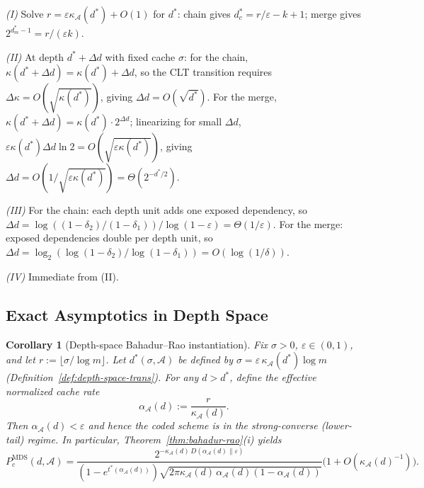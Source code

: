 \documentclass[journal]{IEEEtran}
\makeatletter
\newtheorem{corollary}{Corollary}[section]
\numberwithin{equation}{section}
\renewenvironment{proof}[1][\proofname]{\par
  \pushQED{\qed}%
  \normalfont \topsep6\p@\@plus6\p@\relax
  \trivlist
  \item[\hskip\labelsep
        \itshape
    #1\@addpunct{.}]\ignorespaces
}{%
  \popQED\endtrivlist\@endpefalse
}
\makeatother
\begin{document}
\begin{proof}
\emph{(I)}\;
Solve $r=\varepsilon\kappa_{\mathcal A}(d^*)+O(1)$
for $d^*$: chain gives $d^*_c=r/\varepsilon-k+1$;
merge gives $2^{d^*_m-1}=r/(\varepsilon k)$.

\emph{(II)}\;
At depth $d^*{+}\Delta d$ with fixed cache $\sigma$:
for the chain,
$\kappa(d^*{+}\Delta d)=\kappa(d^*)+\Delta d$, so the
CLT transition requires
$\Delta\kappa=O(\sqrt{\kappa(d^*)})$, giving
$\Delta d=O(\sqrt{d^*})$.
For the merge,
$\kappa(d^*{+}\Delta d)=\kappa(d^*)\cdot 2^{\Delta d}$;
linearizing for small $\Delta d$,
$\varepsilon\kappa(d^*)\Delta d\ln 2
=O(\sqrt{\varepsilon\kappa(d^*)})$,
giving $\Delta d=O(1/\sqrt{\varepsilon\kappa(d^*)})
=\Theta(2^{-d^*/2})$.

\emph{(III)}\;
For the chain: each depth unit adds one exposed
dependency, so
$\Delta d=\log((1{-}\delta_2)/(1{-}\delta_1))/
\log(1{-}\varepsilon)=\Theta(1/\varepsilon)$.
For the merge: exposed dependencies double per depth
unit, so
$\Delta d=\log_2(\log(1{-}\delta_2)/\log(1{-}\delta_1))
=O(\log(1/\delta))$.

\emph{(IV)}\;
Immediate from (II).
\end{proof}

\subsection{Exact Asymptotics in Depth Space}
\label{subsec:depth-exact}

\begin{corollary}[Depth-space Bahadur--Rao instantiation]
\label{cor:depth-br}
Fix \(\sigma>0\), \(\varepsilon\in(0,1)\), and let \(r:=\lfloor \sigma/\log m\rfloor\).
Let \(d^*(\sigma,\mathcal A)\) be defined by \(\sigma=\varepsilon\,\kappa_{\mathcal A}(d^*)\log m\)
(Definition~\ref{def:depth-space-trans}).
For any \(d>d^*\), define the effective normalized cache rate
\[
  \alpha_{\mathcal A}(d):=\frac{r}{\kappa_{\mathcal A}(d)}.
\]
Then \(\alpha_{\mathcal A}(d)<\varepsilon\) and hence the coded scheme is in the strong-converse
(lower-tail) regime. In particular, Theorem~\ref{thm:bahadur-rao}\textup{(i)} yields
\begin{equation}\label{eq:arch-br}
  P_c^{\mathrm{MDS}}(d,\mathcal A)
  =\frac{2^{-\kappa_{\mathcal A}(d)\,
    D(\alpha_{\mathcal A}(d)\|\varepsilon)}}
    {(1-e^{t^*(\alpha_{\mathcal A}(d))})
    \sqrt{2\pi\kappa_{\mathcal A}(d)\,
    \alpha_{\mathcal A}(d)(1-\alpha_{\mathcal A}(d))}}
  \bigl(1+O(\kappa_{\mathcal A}(d)^{-1})\bigr).
\end{equation}
\end{corollary}
\end{document}
